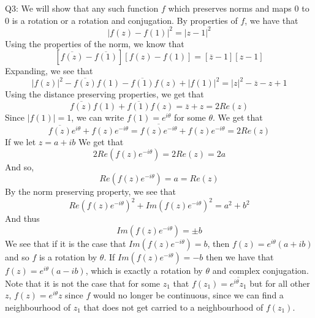 \documentclass[letterpaper]{article}
\newcommand{\ol}{\overline}
\newcommand{\ci}{i}
\begin{document}
\noindent
Q3: We will show that any such function $f$ which preserves norms and maps $0$ to $0$ is a rotation or a rotation and conjugation. By properties of $f$, we have that 
$$|f(z) - f(1) |^2 = |z-1|^2$$
Using the properties of the norm, we know that 
$$[\ol{f(z)} - \ol{f(1)}][f(z) -f(1)] = [\ol{z} - 1][z-1]$$
Expanding, we see that 
$$|f(z)|^2 - \ol{f(z)} f(1) - \ol{f(1)} f(z) + |f(1)|^2 = |z|^2 - \ol{z} - z +1$$
Using the distance preserving properties, we get that 
$$\ol{f(z)} f(1) + \ol{f(1)}f(z) = \ol{z} + z = 2Re(z)$$
Since $|f(1)| =1$, we can write $f(1) = e^{\ci \theta}$ for some $\theta$. We get that 
$$\ol{f(z)} e^{\ci \theta} + f(z) e^{- \ci \theta} = \ol{f(z) e^{- \ci \theta }} + f(z)e^{- \ci \theta} =2Re(z)$$
If we let $z= a+ \ci b$ We get that 
$$2Re(f(z) e^{-\ci \theta}) = 2Re(z) = 2a$$
And so,
$$Re(f(z) e^{-\ci \theta}) = a = Re(z)$$
By the norm preserving property, we see that 
$$Re(f(z) e^{-\ci \theta})^2 + Im(f(z) e^{-\ci \theta})^2 = a^2+ b^2$$
And thus 
$$ Im(f(z) e^{-\ci \theta}) = \pm b $$
We see that if it is the case that $Im(f(z) e^{-\ci \theta}) = b$, then $f(z) = e^{\ci \theta} (a+\ci b)$ and so $f$ is a rotation by $\theta$. If $Im(f(z) e^{-\ci \theta}) = -b$ then we have that $f(z) = e^{\ci \theta} ( a- \ci b)$, which is exactly a rotation by $\theta$ and complex conjugation. Note that it is not the case that for some $z_1$ that $f(z_1) = \ol{e^{i \theta}z_1}$ but for all other $z$, $f(z) = e^{i \theta}z$ since $f$ would no longer be continuous, since we can find a neighbourhood of $z_1$ that does not get carried to a neighbourhood of $f(z_1)$. 
\end{document}
